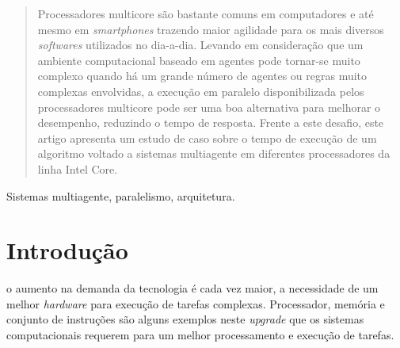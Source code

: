 \documentclass[conference]{IEEEtran}
\begin{document}
\begin{abstract}
Processadores multicore são bastante comuns em computadores e até mesmo em \textit{smartphones} trazendo maior agilidade para os mais diversos \textit{softwares} utilizados no dia-a-dia. Levando em consideração que um ambiente computacional baseado em agentes pode tornar-se muito complexo quando há um grande número de agentes ou regras muito complexas envolvidas, a execução em paralelo disponibilizada pelos processadores multicore pode ser uma boa alternativa para melhorar o desempenho, reduzindo o tempo de resposta. Frente a este desafio, este artigo apresenta um estudo de caso sobre o tempo de execução de um algoritmo voltado a sistemas multiagente em diferentes processadores da linha Intel Core.
\end{abstract}

\begin{IEEEkeywords}
Sistemas multiagente, paralelismo, arquitetura.
\end{IEEEkeywords}






%
\IEEEpeerreviewmaketitle



\section{Introdução}


     o aumento na demanda da tecnologia é cada vez maior, a necessidade de um melhor \textit{hardware} para execução de tarefas complexas. Processador, memória e conjunto de instruções são alguns exemplos neste \textit{upgrade} que os sistemas computacionais requerem para um melhor processamento e execução de tarefas.
        
\end{document}
